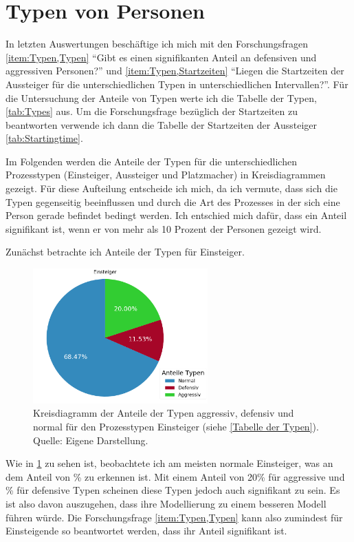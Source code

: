 \section{Typen von Personen} \label{Typen}
In letzten Auswertungen beschäftige ich mich mit den Forschungsfragen \ref{item:Typen,Typen} "`Gibt es einen signifikanten Anteil an defensiven und aggressiven Personen?"' und \ref{item:Typen,Startzeiten} "`Liegen die Startzeiten der Aussteiger für die unterschiedlichen Typen in unterschiedlichen Intervallen?"'. Für die Untersuchung der Anteile von Typen werte ich die Tabelle der Typen, \tablename \ref{tab:Types} aus. Um die Forschungsfrage bezüglich der Startzeiten zu beantworten verwende ich dann die Tabelle der Startzeiten der Aussteiger \tablename \ref{tab:Startingtime}.

Im Folgenden werden die Anteile der Typen für die unterschiedlichen Prozesstypen (Einsteiger, Aussteiger und Platzmacher) in Kreisdiagrammen gezeigt. Für diese Aufteilung entscheide ich mich, da ich vermute, dass sich die Typen gegenseitig beeinflussen und durch die Art des Prozesses in der sich eine Person gerade befindet bedingt werden. Ich entschied mich dafür, dass ein Anteil signifikant ist, wenn er von mehr als 10 Prozent der Personen gezeigt wird.

Zunächst betrachte ich Anteile der Typen für Einsteiger. 
\begin{figure}[H]
	\centering
		\includegraphics[width=0.6\textwidth]{pictures/data_evaluation/types/proportions_Einsteiger.png}
	\caption{Kreisdiagramm der Anteile der Typen aggressiv, defensiv und normal für den Prozesstypen Einsteiger (siehe \ref{Tabelle der Typen}). Quelle: Eigene Darstellung.}
	\label{fig:AnteileTypenEinsteiger}
\end{figure}
Wie in \figurename \ref{fig:AnteileTypenEinsteiger} zu sehen ist, beobachtete ich am meisten normale Einsteiger, was an dem Anteil von  \% zu erkennen ist. Mit einem Anteil von 20\% für aggressive und \% für defensive Typen scheinen diese Typen jedoch auch signifikant zu sein. Es ist also davon auszugehen, dass ihre Modellierung zu einem besseren Modell führen würde. Die Forschungsfrage \ref{item:Typen,Typen} kann also zumindest für Einsteigende so beantwortet werden, dass ihr Anteil signifikant ist. 

